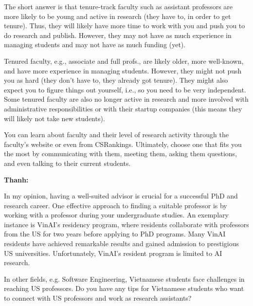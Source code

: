 \documentclass[11pt]{article}
\newenvironment{commentbox}[1][]{
\small
    \begin{cbox}
    \textbf{#1} 
 }{
   \end{cbox}
}
\begin{document}

The short answer is that tenure-track faculty such as assistant professors are more likely to be young and active in research (they have to, in order to get tenure). Thus, they will likely have more time to work with you and push you to do research and publish. However, they may not have as much experience in managing students and may not have as much funding (yet).

Tenured faculty, e.g., associate and full profs., are likely older, more well-known, and have more experience in managing students.  However, they might not push you as hard (they don't have to, they already got tenure). They might also expect you to figure things out yourself, i.e., so you need to be very independent.  Some tenured faculty are also no longer active in research and more involved with administrative responsibilities or with their startup companies (this means they will likely not take new students). 

You can learn about faculty and their level of research activity through the faculty's website or even from CSRankings.
Ultimately, choose one that fits you the most by communicating with them, meeting them, asking them questions, and even talking to their current students. 

\begin{commentbox}[Thanh:]
    In my opinion, having a well-suited advisor is crucial for a successful PhD and research career. One effective approach to finding a suitable professor is by working with a professor during your undergraduate studies. An exemplary instance is VinAI's residency program, where residents collaborate with professors from the US for two years before applying to PhD programs. Many VinAI residents have achieved remarkable results and gained admission to prestigious US universities. Unfortunately, VinAI's resident program is limited to AI research. 
    
    In other fields, e.g. Software Engineering, Vietnamese students face challenges in reaching US professors. Do you have any tips for Vietnamese students who want to connect with US professors and work as research assistants?
    \end{commentbox}
\end{document}
